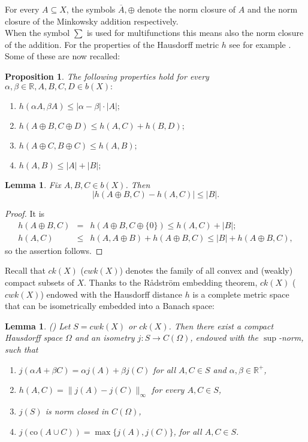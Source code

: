 \documentclass[11pt,a4paper,twoside]{amsart}
\newtheorem{lemma}[theorem]{Lemma}
\newtheorem{proposition}[theorem]{Proposition}
\begin{document}
For every $A\subseteq X$, the symbols $\overline{A}, \oplus $ denote the norm closure of $A$ and
the norm closure of the Minkowsky addition respectively. \\
When the symbol $\sum$ is used for multifunctions this means also the norm closure of the addition.
For the properties of the Hausdorff metric $h$ see for example
\cite{cv,pgcsub,papalibro}. 
Some of these 
are now recalled:
\begin{proposition}\label{ex2.8}
 The following properties hold for every $\alpha
,\beta \in \mathbb{R},A,B,C,D \in b(X):$
\begin{enumerate}[\rm  \ref{ex2.8}.i)]
\item $h(\alpha A,\beta A)\leq |\alpha -\beta |\cdot |A|;$
\item $h(A\oplus B,C\oplus D)\leq h(A,C) + h(B,D);$
\item $h(A\oplus C,B\oplus C)\leq h(A,B);$
\item $h(A,B)\leq |A|+|B|;$
\end{enumerate}
\end{proposition}

\begin{lemma}\label{prop-h}
Fix $A,B,C \in b(X)$.
Then
\[ |h(A \oplus B, C) - h(A,C) | \leq | B|.\] 
\end{lemma}
\begin{proof}
It is
\begin{eqnarray*}
h(A \oplus B, C ) &=& h(A \oplus B, C \oplus \{ 0\}) \leq h(A,C) + |B |;\\
h(A, C) &\leq& h(A, A \oplus B) + h(A \oplus B,C) \leq |B| + h(A \oplus B,C),
\end{eqnarray*}
so the assertion follows.
\end{proof}
Recall that $ck(X)$ ($cwk(X)$) denotes the family of all convex and (weakly) compact subsets of  $X$. 
Thanks to the R{\aa}dstr\"{o}m embedding theorem,
$ck(X)$ ($cwk(X)$) endowed with the Hausdorff distance $h$ is a complete metric space that can be isometrically embedded
 into a Banach space:

\begin{lemma}\label{labu} {\rm (\cite[Theorems 5.6 and 5.7]{L1})}
Let $S=cwk(X)$ or $ck(X)$. Then there exist a compact Hausdorff space $\Omega$ and an isometry $j:S\to C(\Omega)$, endowed with the $\sup$-norm, such that 
\begin{enumerate}
\item $j(\alpha A + \beta C) = \alpha j(A) + \beta j(C)$ for all $A,C \in S$ and $\alpha, \beta \in \mathbb{R}^+$,
\item $h(A,C) = \| j(A) - j(C) \|_{\infty}$ for every $A,C \in S$,
\item $j(S)$ is norm closed in $C(\Omega)$,
\item $j(\mbox{co}(A \cup C)) = \max \{j(A), j(C) \}$, for all $A,C \in S$.
\end{enumerate}
\end{lemma}
\end{document}
